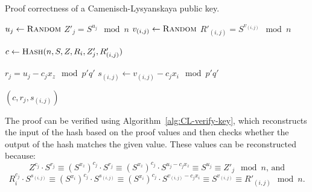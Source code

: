 \begin{algorithm}
  \caption{Proof correctness of a Camenisch-Lysyanskaya public key.}
  \label{alg:CL-proof-key}
  \addtolength{\baselineskip}{1mm}
  \begin{algorithmic}[1]
        \State $u_j \gets \Call{Random}{}$
        \State $Z'_j = S^{u_j} \mod n$
          \State $v_{(i,j)} \gets \Call{Random}{}$
          \State $R'_{(i,j)} = S^{v_{(i,j)}} \mod n$
        \EndFor
      \EndFor

      \State $c \gets \Call{Hash}{n, S, Z, R_i, Z'_j, R'_{(i,j)}}$

        \State $r_j = u_j - c_j x_z \mod p'q'$
          \State $s_{(i,j)} \gets v_{(i,j)} - c_j x_i \mod p'q'$
        \EndFor
      \EndFor

      \Return $(c, r_j, s_{(i,j)})$
    \EndFunction
  \end{algorithmic}
\end{algorithm}

The proof can be verified using Algorithm~\ref{alg:CL-verify-key}, which
reconstructs the input of the hash based on the proof values and then checks
whether the output of the hash matches the given value. These values can be
reconstructed because:
\begin{equation*}
  Z^{c_j} \cdot S^{r_j}
  \equiv (S^{x_z})^{c_j} \cdot S^{r_j}
  \equiv (S^{x_z})^{c_j} \cdot S^{u_j - c_j x_z}
  \equiv S^{u_j}
  \equiv Z'_j \mod n \text{, and}
\end{equation*}
\begin{equation*}
  R_i^{c_j} \cdot S^{s_{(i,j)}}
  \equiv (S^{x_i})^{c_j} \cdot S^{s_{(i,j)}}
  \equiv (S^{x_i})^{c_j} \cdot S^{v_{(i,j)}-c_j x_i}
  \equiv S^{v_{(i,j)}}
  \equiv R'_{(i,j)} \mod n \text{.}
\end{equation*}

